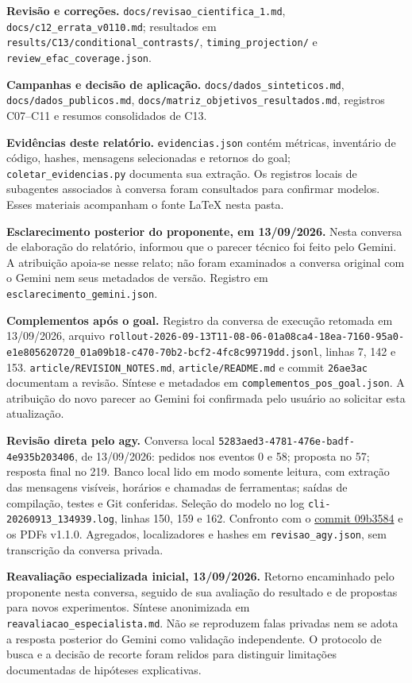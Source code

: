 \documentclass[11pt,a4paper]{article}
\begin{document}
{\begin{enumerate}[label={\textbf{[\arabic*]}},leftmargin=2em,itemsep=5pt]
\item \textbf{Revisão e correções.} \nolinkurl{docs/revisao_cientifica_1.md}, \nolinkurl{docs/c12_errata_v0110.md}; resultados em \nolinkurl{results/C13/conditional_contrasts/}, \nolinkurl{timing_projection/} e \nolinkurl{review_efac_coverage.json}.
\item \textbf{Campanhas e decisão de aplicação.} \nolinkurl{docs/dados_sinteticos.md}, \nolinkurl{docs/dados_publicos.md}, \nolinkurl{docs/matriz_objetivos_resultados.md}, registros C07--C11 e resumos consolidados de C13.
\item \textbf{Evidências deste relatório.} \nolinkurl{evidencias.json} contém métricas, inventário de código, hashes, mensagens selecionadas e retornos do goal; \nolinkurl{coletar_evidencias.py} documenta sua extração. Os registros locais de subagentes associados à conversa foram consultados para confirmar modelos. Esses materiais acompanham o fonte LaTeX nesta pasta.
\item \textbf{Esclarecimento posterior do proponente, em 13/09/2026.} Nesta conversa de elaboração do relatório, informou que o parecer técnico foi feito pelo Gemini. A atribuição apoia-se nesse relato; não foram examinados a conversa original com o Gemini nem seus metadados de versão. Registro em \nolinkurl{esclarecimento_gemini.json}.
\item \textbf{Complementos após o goal.} Registro da conversa de execução retomada em 13/09/2026, arquivo \nolinkurl{rollout-2026-09-13T11-08-06-01a08ca4-18ea-7160-95a0-e1e805620720_01a09b18-c470-70b2-bcf2-4fc8c99719dd.jsonl}, linhas 7, 142 e 153. \nolinkurl{article/REVISION_NOTES.md}, \nolinkurl{article/README.md} e commit \nolinkurl{26ae3ac} documentam a revisão. Síntese e metadados em \nolinkurl{complementos_pos_goal.json}. A atribuição do novo parecer ao Gemini foi confirmada pelo usuário ao solicitar esta atualização.
\item \textbf{Revisão direta pelo agy.} Conversa local \nolinkurl{5283aed3-4781-476e-badf-4e935b203406}, de 13/09/2026: pedidos nos eventos 0 e 58; proposta no 57; resposta final no 219. Banco local lido em modo somente leitura, com extração das mensagens visíveis, horários e chamadas de ferramentas; saídas de compilação, testes e Git conferidas. Seleção do modelo no log \nolinkurl{cli-20260913_134939.log}, linhas 150, 159 e 162. Confronto com o \href{https://github.com/flavioluiz/TGdoWayne/commit/09b3584b5eea40251f84fb594da9551cba2b925d}{commit 09b3584} e os PDFs v1.1.0. Agregados, localizadores e hashes em \nolinkurl{revisao_agy.json}, sem transcrição da conversa privada.
\item \textbf{Reavaliação especializada inicial, 13/09/2026.} Retorno encaminhado pelo proponente nesta conversa, seguido de sua avaliação do resultado e de propostas para novos experimentos. Síntese anonimizada em \nolinkurl{reavaliacao_especialista.md}. Não se reproduzem falas privadas nem se adota a resposta posterior do Gemini como validação independente. O protocolo de busca e a decisão de recorte foram relidos para distinguir limitações documentadas de hipóteses explicativas.
\end{enumerate}}
\end{document}
